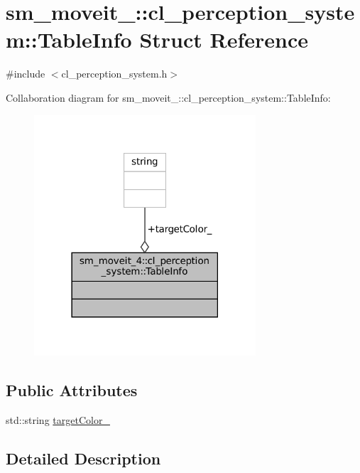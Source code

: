 \hypertarget{structsm__moveit__4_1_1cl__perception__system_1_1TableInfo}{}\section{sm\+\_\+moveit\+\_\+:\+:cl\+\_\+perception\+\_\+system\+:\+:Table\+Info Struct Reference}
\label{structsm__moveit__4_1_1cl__perception__system_1_1TableInfo}


{\ttfamily \#include $<$cl\+\_\+perception\+\_\+system.\+h$>$}



Collaboration diagram for sm\+\_\+moveit\+\_\+:\+:cl\+\_\+perception\+\_\+system\+:\+:Table\+Info\+:
\nopagebreak
\begin{figure}[H]
\begin{center}
\leavevmode
\includegraphics[width=234pt]{structsm__moveit__4_1_1cl__perception__system_1_1TableInfo__coll__graph}
\end{center}
\end{figure}
\subsection*{Public Attributes}
\begin{DoxyCompactItemize}
\item 
std\+::string \hyperlink{structsm__moveit__4_1_1cl__perception__system_1_1TableInfo_ad4361daafb35048ab3d507850f02eeba}{target\+Color\+\_\+}
\end{DoxyCompactItemize}


\subsection{Detailed Description}


